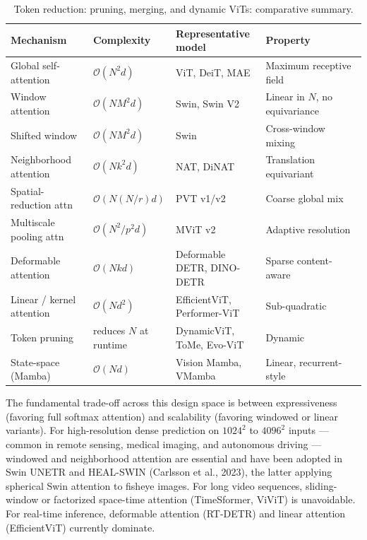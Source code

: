 \documentclass{article}
\begin{document}
\begin{table}[t]
\centering
\caption{Token reduction: pruning, merging, and dynamic ViTs: comparative summary.}
\label{tab:token-reduction-pruning-merging-and-dynamic-vits}
\begin{tabular}{>{\raggedright\arraybackslash}p{0.2358\linewidth}
  >{\raggedright\arraybackslash}p{0.2264\linewidth}
  >{\raggedright\arraybackslash}p{0.2547\linewidth}
  >{\raggedright\arraybackslash}p{0.2830\linewidth}}
\toprule
Mechanism & Complexity & Representative model & Property \\
\midrule
Global self-attention & \(\mathcal{O}(N^2 d)\) & ViT, DeiT, MAE & Maximum receptive field \\
Window attention & \(\mathcal{O}(N M^2 d)\) & Swin, Swin V2 & Linear in \(N\), no equivariance \\
Shifted window & \(\mathcal{O}(N M^2 d)\) & Swin & Cross-window mixing \\
Neighborhood attention & \(\mathcal{O}(N k^2 d)\) & NAT, DiNAT & Translation equivariant \\
Spatial-reduction attn & \(\mathcal{O}(N (N/r) d)\) & PVT v1/v2 & Coarse global mix \\
Multiscale pooling attn & \(\mathcal{O}(N^2/p^2 d)\) & MViT v2 & Adaptive resolution \\
Deformable attention & \(\mathcal{O}(N k d)\) & Deformable DETR, DINO-DETR & Sparse content-aware \\
Linear / kernel attention & \(\mathcal{O}(N d^2)\) & EfficientViT, Performer-ViT & Sub-quadratic \\
Token pruning & reduces \(N\) at runtime & DynamicViT, ToMe, Evo-ViT & Dynamic \\
State-space (Mamba) & \(\mathcal{O}(N d)\) & Vision Mamba, VMamba & Linear, recurrent-style \\
\end{tabular}
\end{table}

The fundamental trade-off across this design space is between expressiveness (favoring full softmax attention) and scalability (favoring windowed or linear variants). For high-resolution dense prediction on \(1024^2\) to \(4096^2\) inputs --- common in remote sensing, medical imaging, and autonomous driving --- windowed and neighborhood attention are essential and have been adopted in Swin UNETR \citep{hatamizadeh2022swinunetrswintrans} and HEAL-SWIN (Carlsson et al., 2023), the latter applying spherical Swin attention to fisheye images. For long video sequences, sliding-window or factorized space-time attention (TimeSformer, ViViT) is unavoidable. For real-time inference, deformable attention (RT-DETR) and linear attention (EfficientViT) currently dominate.
\end{document}
